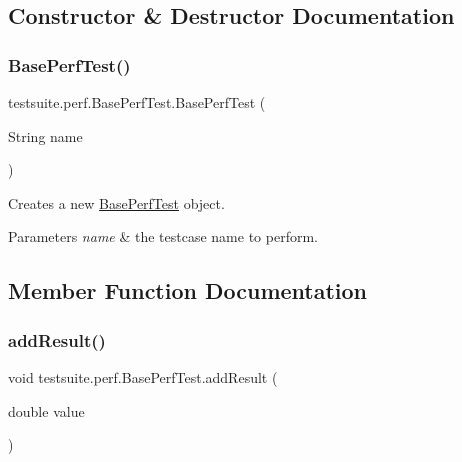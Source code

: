 \subsection{Constructor \& Destructor Documentation}
\mbox{\label{classtestsuite_1_1perf_1_1_base_perf_test_a31aa6418a4c1089b614c41ea0b9bd924}} 
\subsubsection{\texorpdfstring{Base\+Perf\+Test()}{BasePerfTest()}}
{\footnotesize\ttfamily testsuite.\+perf.\+Base\+Perf\+Test.\+Base\+Perf\+Test (\begin{DoxyParamCaption}\item[{String}]{name }\end{DoxyParamCaption})}

Creates a new \mbox{\hyperlink{classtestsuite_1_1perf_1_1_base_perf_test}{Base\+Perf\+Test}} object.


\begin{DoxyParams}{Parameters}
{\em name} & the testcase name to perform. \\
\hline
\end{DoxyParams}


\subsection{Member Function Documentation}
\mbox{\label{classtestsuite_1_1perf_1_1_base_perf_test_a4949a27d2e0b9c314d12f45128004da2}} 
\subsubsection{\texorpdfstring{add\+Result()}{addResult()}}
{\footnotesize\ttfamily void testsuite.\+perf.\+Base\+Perf\+Test.\+add\+Result (\begin{DoxyParamCaption}\item[{double}]{value }\end{DoxyParamCaption})\hspace{0.3cm}{\ttfamily [protected]}}

